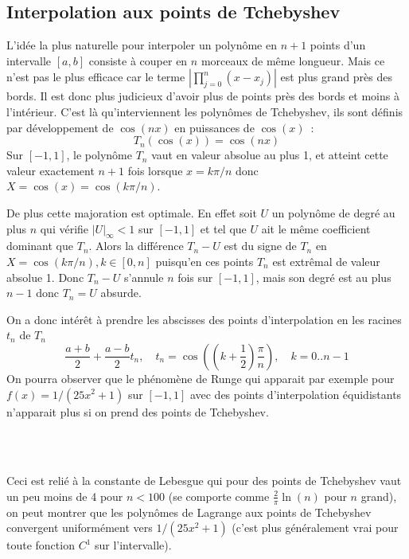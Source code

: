 \documentclass[a4paper,11pt]{book}
\begin{document}
\begin{giacjshere}
\section{Interpolation aux points de Tchebyshev}
L'id\'ee la plus naturelle pour interpoler un polyn\^ome en $n+1$
points d'un intervalle $[a,b]$ consiste \`a couper en $n$ morceaux
de m\^eme longueur. Mais ce n'est pas le plus efficace car le
terme $|\prod_{j=0}^n(x-x_j)|$ est plus grand pr\`es des bords. Il est
donc plus judicieux d'avoir plus de points pr\`es des bords et moins
\`a l'int\'erieur. C'est l\`a qu'interviennent les polyn\^omes de
Tchebyshev, ils sont d\'efinis par d\'eveloppement de $\cos(nx)$
en puissances de $\cos(x)$~:
$$ T_n(\cos(x))=\cos(nx) $$
Sur $[-1,1]$, le polyn\^ome $T_n$ vaut en valeur absolue au plus 1, et
atteint cette valeur exactement $n+1$ fois lorsque $x=k\pi/n$ donc 
$X=\cos(x)=\cos(k\pi/n)$.\\

De plus cette majoration est optimale. En effet
soit $U$ un polyn\^ome de degr\'e au plus $n$ 
qui v\'erifie $|U|_\infty<1$ sur $[-1,1]$
et tel que $U$ ait le m\^eme coefficient dominant que
$T_n$. Alors la diff\'erence $T_n-U$ est du signe de $T_n$ en
$X=\cos(k\pi/n), k \in [0,n]$ puisqu'en ces points $T_n$ est
extr\^emal de valeur absolue 1. Donc $T_n-U$ s'annule $n$ fois sur
$[-1,1]$, mais son degr\'e est au plus $n-1$ donc $T_n=U$ absurde.

On a donc int\'er\^et \`a prendre les abscisses des points
d'interpolation en les racines $t_n$ de $T_n$
$$ \frac{a+b}{2} + \frac{a-b}{2} t_n, \quad t_n=\cos((k+\frac{1}{2})\frac\pi n), 
\quad k=0..n-1$$
On pourra observer que le ph\'enom\`ene de 
Runge qui apparait par
exemple pour $f(x)=1/(25x^2+1)$ sur $[-1,1]$ avec des points d'interpolation
\'equidistants n'apparait plus si on prend des points de Tchebyshev.\\
\\

\\

Ceci est reli\'e \`a la constante de Lebesgue 
qui pour des points de Tchebyshev vaut un peu moins de 4 pour $n<100$
(se comporte comme $\frac2\pi \ln(n)$ pour $n$ grand), on peut montrer
que les polyn\^omes de Lagrange aux points de Tchebyshev convergent
uniform\'ement vers $1/(25x^2+1)$ (c'est plus g\'en\'eralement
vrai pour toute fonction $C^1$ sur l'intervalle).


\end{giacjshere}
\end{document}
